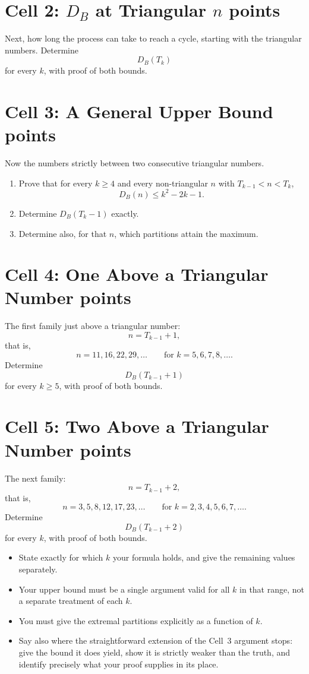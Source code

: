\documentclass[11pt]{article}
\theoremstyle{definition}
\newcommand{\DB}{D_B}
\newcommand{\cell}[3]{%
  \section*{Cell #1: #2\hfill{\normalsize\mdseries #3}}}
\begin{document}
\cell{2}{$\DB$ at Triangular $n$}{2 points}

Next, how long the process can take to reach a cycle, starting with
the triangular numbers. Determine
\[
  \DB(T_k)
\]
for every $k$, with proof of both bounds.

\cell{3}{A General Upper Bound}{3 points}

Now the numbers strictly between two consecutive triangular numbers.

\begin{enumerate}[label=(\alph*), leftmargin=*]
  \item Prove that for every $k \geq 4$ and every non-triangular $n$
    with $T_{k-1} < n < T_k$,
    \[
      \DB(n) \leq k^2 - 2k - 1.
    \]
  \item Determine $\DB(T_k - 1)$ exactly.
  \item Determine also, for that $n$, which partitions attain the
    maximum.
\end{enumerate}

\cell{4}{One Above a Triangular Number}{5 points}

The first family just above a triangular number:
\[
  n = T_{k-1} + 1,
\]
that is,
\[
  n = 11, 16, 22, 29, \ldots
  \qquad \text{for } k = 5, 6, 7, 8, \ldots.
\]
Determine
\[
  \DB(T_{k-1} + 1)
\]
for every $k \geq 5$, with proof of both bounds.

\cell{5}{Two Above a Triangular Number}{8 points}

The next family:
\[
  n = T_{k-1} + 2,
\]
that is,
\[
  n = 3, 5, 8, 12, 17, 23, \ldots
  \qquad \text{for } k = 2, 3, 4, 5, 6, 7, \ldots.
\]
Determine
\[
  \DB(T_{k-1} + 2)
\]
for every $k$, with proof of both bounds.

\begin{itemize}[leftmargin=*]
  \item State exactly for which $k$ your formula holds, and give the
    remaining values separately.
  \item Your upper bound must be a single argument valid for all $k$
    in that range, not a separate treatment of each $k$.
  \item You must give the extremal partitions explicitly as a
    function of $k$.
  \item Say also where the straightforward extension of the Cell~3
    argument stops: give the bound it does yield, show it is strictly
    weaker than the truth, and identify precisely what your proof
    supplies in its place.
\end{itemize}
\end{document}
